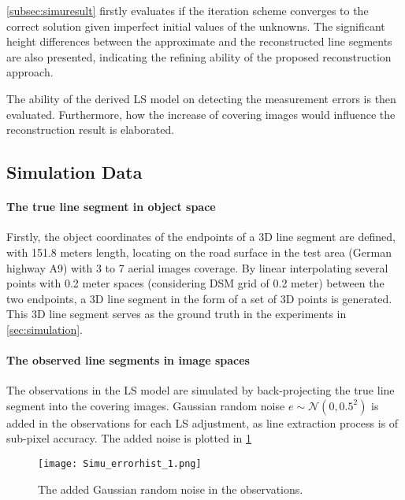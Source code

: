 \cref{subsec:simuresult} firstly evaluates if the iteration scheme converges to the correct solution given imperfect initial values of the unknowns. The significant height differences between the approximate and the reconstructed line segments are also presented, indicating the refining ability of the proposed reconstruction approach.

The ability of the derived LS model on detecting the measurement errors is then evaluated. Furthermore, how the increase of covering images would influence the reconstruction result is elaborated.





\subsection{Simulation Data}
\label{subsec:simudata}

\paragraph{The true line segment in object space}
Firstly, the object coordinates of the endpoints of a 3D line segment are defined, with 151.8 meters length, locating on the road surface in the test area (German highway A9) with 3 to 7 aerial images coverage. By linear interpolating several points with 0.2 meter spaces (considering DSM grid of 0.2 meter) between the two endpoints, a 3D line segment in the form of a set of 3D points is generated. This 3D line segment serves as the ground truth in the experiments in \cref{sec:simulation}. 

\paragraph{The observed line segments in image spaces}
The observations in the LS model are simulated by back-projecting the true line segment into the covering images. Gaussian random noise $e\sim\mathcal{N}(0,0.5^2)$ is added in the observations for each LS adjustment, as line extraction process is of sub-pixel accuracy. The added noise is plotted in \cref{fig:noise}

\begin{figure}
  \centering
  \texttt{[image: Simu\_errorhist\_1.png]}
  \caption{\small The added Gaussian random noise in the observations.}
  \label{fig:noise}
\end{figure}

